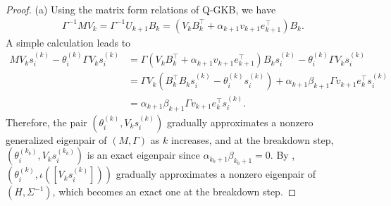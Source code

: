 \documentclass[]{myarticle}
\begin{document}
\begin{proof}
  (a) Using the matrix form relations of Q-GKB, we have
  \begin{align*}
    \Gamma^{-1}MV_{k} = \Gamma^{-1}U_{k+1}B_{k}
    = (V_{k}B_{k}^{\top}+\alpha_{k+1}v_{k+1}e_{k+1}^{\top})B_{k}.
  \end{align*}
  A simple calculation leads to 
  \begin{align*}
    MV_{k}s_{i}^{(k)} - \theta_{i}^{(k)}\Gamma V_{k}s_{i}^{(k)}
    &= \Gamma(V_{k}B_{k}^{\top}+\alpha_{k+1}v_{k+1}e_{k+1}^{\top})B_{k}s_{i}^{(k)} - \theta_{i}^{(k)}\Gamma V_{k}s_{i}^{(k)} \\
    &= \Gamma V_{k}(B_{k}^{\top}B_{k}s_{i}^{(k)}-\theta_{i}^{(k)}s_{i}^{(k)}) + \alpha_{k+1}\beta_{k+1}\Gamma v_{k+1}e_{k}^{\top}s_{i}^{(k)} \\
    &= \alpha_{k+1}\beta_{k+1}\Gamma v_{k+1}e_{k}^{\top}s_{i}^{(k)}.
  \end{align*}
  Therefore, the pair $\left(\theta_{i}^{(k)}, V_{k}s_{i}^{(k)}\right)$ gradually approximates a nonzero generalized eigenpair of $(M,\Gamma)$ as $k$ increases, and at the breakdown step, $\left(\theta_{i}^{(k_b)}, V_{k}s_{i}^{(k_b)}\right)$ is an exact eigenpair since $\alpha_{k_b+1}\beta_{k_b+1}=0$. By , $\left(\theta_{i}^{(k)},\iota\left([V_{k}s_{i}^{(k)}]\right)\right)$ gradually approximates a nonzero eigenpair of $(H, \Sigma^{-1})$, which becomes an exact one at the breakdown step.


\end{proof}
\end{document}
